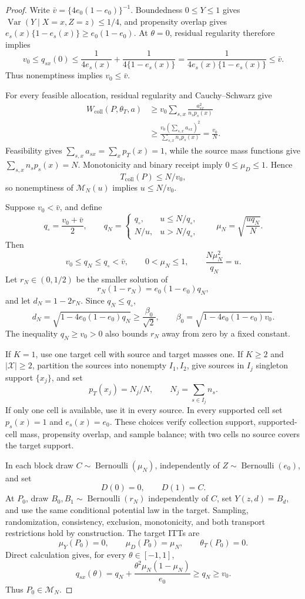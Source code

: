 \documentclass{article}
\begin{document}
\begin{proof}
Write \(\bar v=\{4e_0(1-e_0)\}^{-1}\). Boundedness \(0\le Y\le1\) gives \(\operatorname{Var}(Y\mid X=x,Z=z)\le1/4\), and propensity overlap gives \(e_s(x)\{1-e_s(x)\}\ge e_0(1-e_0)\). At \(\theta=0\), residual regularity therefore implies
\[
v_0\le q_{sx}(0)
\le\frac1{4e_s(x)}+\frac1{4\{1-e_s(x)\}}
=\frac1{4e_s(x)\{1-e_s(x)\}}
\le\bar v.
\]
Thus nonemptiness implies \(v_0\le\bar v\).

For every feasible allocation, residual regularity and Cauchy--Schwarz give
\[
\begin{aligned}
W_{\mathrm{coll}}(P,\theta_T,a)
&\ge v_0\sum_{s,x}\frac{a_{sx}^2}{n_sp_s(x)}\\
&\ge\frac{v_0(\sum_{s,x}a_{sx})^2}{\sum_{s,x}n_sp_s(x)}
=\frac{v_0}{N}.
\end{aligned}
\]
Feasibility gives \(\sum_{s,x}a_{sx}=\sum_xp_T(x)=1\), while the source mass functions give \(\sum_{s,x}n_sp_s(x)=N\). Monotonicity and binary receipt imply \(0\le\mu_D\le1\). Hence
\[
T_{\mathrm{coll}}(P)\le N/v_0,
\]
so nonemptiness of \(\mathcal M_N(u)\) implies \(u\le N/v_0\).

Suppose \(v_0<\bar v\), and define
\[
q_\circ=\frac{v_0+\bar v}{2},\qquad
q_N=\begin{cases}
q_\circ,&u\le N/q_\circ,\\[2pt]
N/u,&u>N/q_\circ,
\end{cases}
\qquad
\mu_N=\sqrt{\frac{uq_N}{N}}.
\]
Then
\[
v_0\le q_N\le q_\circ<\bar v,\qquad
0<\mu_N\le1,\qquad
\frac{N\mu_N^2}{q_N}=u.
\]
Let \(r_N\in(0,1/2)\) be the smaller solution of
\[
r_N(1-r_N)=e_0(1-e_0)q_N,
\]
and let \(d_N=1-2r_N\). Since \(q_N\le q_\circ\),
\[
d_N=\sqrt{1-4e_0(1-e_0)q_N}\ge\frac{\beta_0}{\sqrt2},
\qquad
\beta_0=\sqrt{1-4e_0(1-e_0)v_0}.
\]
The inequality \(q_N\ge v_0>0\) also bounds \(r_N\) away from zero by a fixed constant.

If \(K=1\), use one target cell with source and target masses one. If \(K\ge2\) and \(|\mathcal X|\ge2\), partition the sources into nonempty \(I_1,I_2\), give sources in \(I_j\) singleton support \(\{x_j\}\), and set
\[
p_T(x_j)=N_j/N,\qquad N_j=\sum_{s\in I_j}n_s.
\]
If only one cell is available, use it in every source. In every supported cell set \(p_s(x)=1\) and \(e_s(x)=e_0\). These choices verify collection support, supported-cell mass, propensity overlap, and sample balance; with two cells no source covers the target support.

In each block draw \(C\sim\operatorname{Bernoulli}(\mu_N)\), independently of \(Z\sim\operatorname{Bernoulli}(e_0)\), and set
\[
D(0)=0,\qquad D(1)=C.
\]
At \(P_0\), draw \(B_0,B_1\sim\operatorname{Bernoulli}(r_N)\) independently of \(C\), set \(Y(z,d)=B_d\), and use the same conditional potential law in the target. Sampling, randomization, consistency, exclusion, monotonicity, and both transport restrictions hold by construction. The target ITTs are
\[
\mu_Y(P_0)=0,\qquad \mu_D(P_0)=\mu_N,\qquad\theta_T(P_0)=0.
\]
Direct calculation gives, for every \(\theta\in[-1,1]\),
\[
q_{sx}(\theta)=q_N+\frac{\theta^2\mu_N(1-\mu_N)}{e_0}\ge q_N\ge v_0.
\]
Thus \(P_0\in\mathcal M_N\).


\end{proof}
\end{document}
